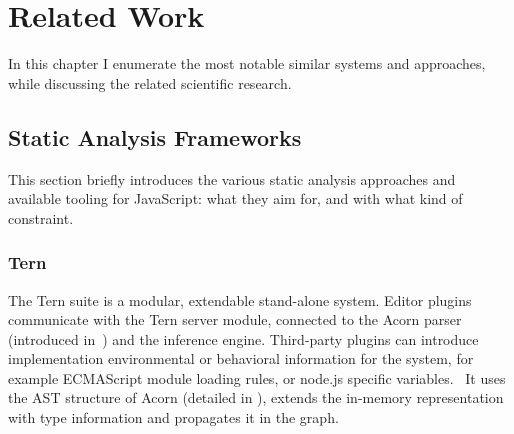 \chapter{Related Work}
\label{chap:related-work}

In this chapter I enumerate the most notable similar systems and approaches, while discussing the related scientific research.

\section{Static Analysis Frameworks}
This section briefly introduces the various static analysis approaches and available tooling for JavaScript: what they aim for, and with what kind of constraint.

\subsection{Tern}
\label{sect:tern}

The Tern suite is a modular, extendable stand-alone system. Editor plugins communicate with the Tern server module, connected to the Acorn parser (introduced in~) and the inference engine. Third-party plugins can introduce implementation environmental or behavioral information for the system, for example ECMAScript module loading rules, or node.js specific variables.~\cite{tern-docs} It uses the AST structure of Acorn (detailed in ), extends the in-memory representation with type information and propagates it in the graph.


